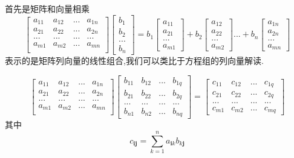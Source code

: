\documentclass[oneside]{book}
\begin{document}
	首先是矩阵和向量相乘
	$$
		\left[
		\begin{array}{cccc}
			a_{11} & a_{12} & ... & a_{1n}\\
			a_{21} & a_{22} & ... & a_{2n}\\
			... & ... & ... & ...\\
			a_{m1} & a_{m2} & ... & a_{mn}\\
		\end{array}
		\right]
		\left[
		\begin{array}{c}
			b_{1}\\
			b_{2}\\
			...\\
			b_{n}
		\end{array}
		\right]
		=
		b_{1}\left[
		\begin{array}{c}
			a_{11}\\
			a_{21}\\
			...\\
			a_{m1}
		\end{array}
		\right]
		+
		b_{2}\left[
		\begin{array}{c}
			a_{12}\\
			a_{22}\\
			...\\
			a_{m2}
		\end{array}
		\right]
		...
		+
		b_{n}\left[
		\begin{array}{c}
			a_{1n}\\
			a_{2n}\\
			...\\
			a_{mn}
		\end{array}
		\right]$$
	表示的是矩阵列向量的线性组合,我们可以类比于方程组的列向量解读.
	
$$
	\left[
	\begin{array}{cccc}
		a_{11} & a_{12} & ... & a_{1n}\\
		a_{21} & a_{22} & ... & a_{2n}\\
		... & ... & ... & ...\\
		a_{m1} & a_{m2} & ... & a_{mn}\\
	\end{array}
	\right]
	\left[
	\begin{array}{cccc}
		b_{11} & b_{12} & ... & b_{1q}\\
		b_{21} & b_{22} & ... & b_{2q}\\
		... & ... & ... &...\\
		b_{n1} & b_{n2} & ... & b_{nq}
	\end{array}
	\right]
	=
	\left[
	\begin{array}{cccc}
		c_{11} & c_{12} & ... & c_{1q}\\
		c_{21} & c_{22} & ... & c_{2q}\\
		... & ... & ... &...\\
		c_{m1} & c_{m2} & ... & c_{mq}
	\end{array}
	\right]
	$$
	其中$$ c_{\textbf{ij}}=\sum_{k=1}^{n}a_{\textbf{i}k}b_{k\textbf{j}} $$
	
\end{document}

